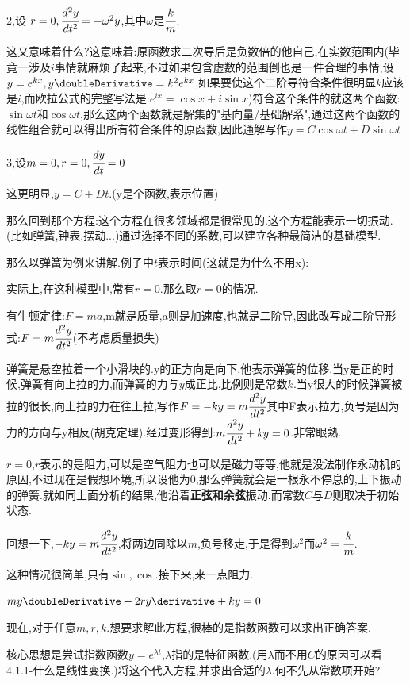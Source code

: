 {{{2,设 $r = 0, \cfrac{d^2y}{dt^2} = -\omega^2y$,其中$\omega$是$\cfrac{k}{m}$.

这又意味着什么?这意味着:原函数求二次导后是负数倍的他自己,在实数范围内(毕竟一涉及$i$事情就麻烦了起来,不过如果包含虚数的范围倒也是一件合理的事情,设$y=e^{kx},y\doubleDerivative = k^{2}e^{kx}$,如果要使这个二阶导符合条件很明显$k$应该是$i$,而欧拉公式的完整写法是:$e^{ix} = \cos x + i\sin x$)符合这个条件的就这两个函数:$\sin\omega t$和$\cos\omega t$,那么这两个函数就是解集的"基向量/基础解系",通过这两个函数的线性组合就可以得出所有符合条件的原函数,因此通解写作$y = C\cos\omega t + D\sin\omega t$

3,设$m = 0, r = 0, \cfrac{dy}{dt} = 0$

这更明显,$y = C + Dt$.(y是个函数,表示位置)

那么回到那个方程:这个方程在很多领域都是很常见的.这个方程能表示一切振动.(比如弹簧,钟表,摆动...)通过选择不同的系数,可以建立各种最简洁的基础模型.

那么以弹簧为例来讲解.例子中$t$表示时间(这就是为什么不用x):

实际上,在这种模型中,常有$r = 0$.那么取$ r = 0$的情况.

有牛顿定律:$F = ma$,m就是质量,a则是加速度,也就是二阶导,因此改写成二阶导形式:$F = m\cfrac{d^2y}{dt^2}$(不考虑质量损失)

弹簧是悬空拉着一个小滑块的.y的正方向是向下,他表示弹簧的位移,当y是正的时候,弹簧有向上拉的力,而弹簧的力与$y$成正比,比例则是常数$k$.当y很大的时候弹簧被拉的很长,向上拉的力在往上拉,写作$F = -ky = m\cfrac{d^2y}{dt^2}$其中F表示拉力,负号是因为力的方向与y相反(胡克定理).经过变形得到:$m\cfrac{d^2y}{dt^2} + ky = 0$.非常眼熟.

$r = 0$,$r$表示的是阻力,可以是空气阻力也可以是磁力等等,他就是没法制作永动机的原因,不过现在是假想环境,所以设他为0,那么弹簧就会是一根永不停息的,上下振动的弹簧.就如同上面分析的结果,他沿着{\bfseries 正弦和余弦}振动.而常数$C$与$D$则取决于初始状态.

回想一下,$-ky = m\cfrac{d^2y}{dt^2}$,将两边同除以$m$,负号移走,于是得到$\omega^2$而$\omega^2 = \cfrac{k}{m}$.

这种情况很简单,只有$\sin , \cos$.接下来,来一点阻力.

$my\doubleDerivative + 2ry\derivative + ky = 0$

现在,对于任意$m,r,k$.想要求解此方程,很棒的是指数函数可以求出正确答案.

核心思想是尝试指数函数$y = e^{\lambda t}$,$\lambda$指的是特征函数.(用$\lambda$而不用$C$的原因可以看4.1.1-什么是线性变换.)将这个代入方程,并求出合适的$\lambda$.何不先从常数项开始?

}}}
